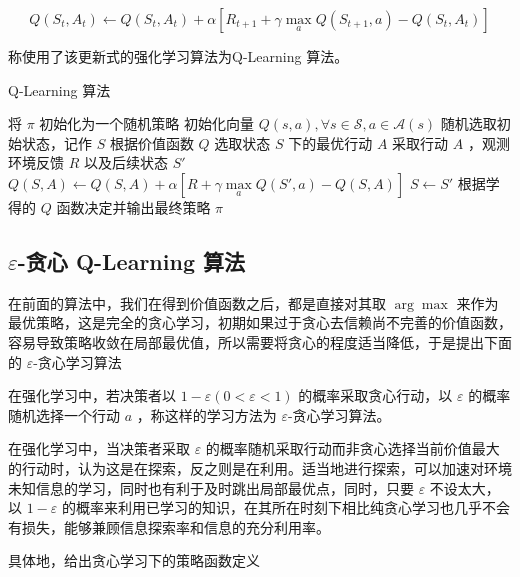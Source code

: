 \begin{equation}\label{eq:qlearning}
    Q(S_t,A_t)\leftarrow Q(S_t,A_t)+\alpha\left[R_{t+1}+\gamma  \max\limits_aQ(S_{t+1},a)-Q(S_t,A_t)\right]
\end{equation}

称使用了该更新式的强化学习算法为{\jiacu Q-Learning 算法}。

\begin{algorithm}[H]
    \caption{Q-Learning 算法}
    \begin{algorithmic}[1] %
        \State 将 $\pi$ 初始化为一个随机策略
        \State 初始化向量 $Q(s,a), \forall s\in \mathcal S,a\in \mathcal{A}(s)$
        \Loop
        \State 随机选取初始状态，记作 $S$
        \Repeat
        \State 根据价值函数 $Q$ 选取状态 $S$ 下的最优行动 $A$
        \State 采取行动 $A$ ，观测环境反馈 $R$ 以及后续状态 $S'$
        \State $Q(S,A)\leftarrow Q(S,A)+\alpha\left[R+\gamma  \max\limits_aQ(S',a)-Q(S,A)\right]$
        \State $S\leftarrow S'$
        \EndLoop
        \State
        \State 根据学得的 $Q$ 函数决定并输出最终策略 $\pi$
    \end{algorithmic}
\end{algorithm}

\subsection{$\varepsilon$-贪心 Q-Learning 算法}

在前面的算法中，我们在得到价值函数之后，都是直接对其取 $\arg\max$ 来作为最优策略，这是完全的贪心学习，初期如果过于贪心去信赖尚不完善的价值函数，容易导致策略收敛在局部最优值，所以需要将贪心的程度适当降低，于是提出下面的 $\varepsilon$-贪心学习算法

\begin{Definition}
    在强化学习中，若决策者以 $1-\varepsilon(0<\varepsilon<1)$ 的概率采取贪心行动，以 $\varepsilon$ 的概率随机选择一个行动 $a$ ，称这样的学习方法为 $\varepsilon$-贪心学习算法。
\end{Definition}

在强化学习中，当决策者采取 $\varepsilon$ 的概率随机采取行动而非贪心选择当前价值最大的行动时，认为这是在{\jiacu 探索}，反之则是在{\jiacu 利用}。适当地进行探索，可以加速对环境未知信息的学习，同时也有利于及时跳出局部最优点，同时，只要 $\varepsilon$ 不设太大，以 $1-\varepsilon$ 的概率来利用已学习的知识，在其所在时刻下相比纯贪心学习也几乎不会有损失，能够兼顾信息探索率和信息的充分利用率。

具体地，给出贪心学习下的策略函数定义

